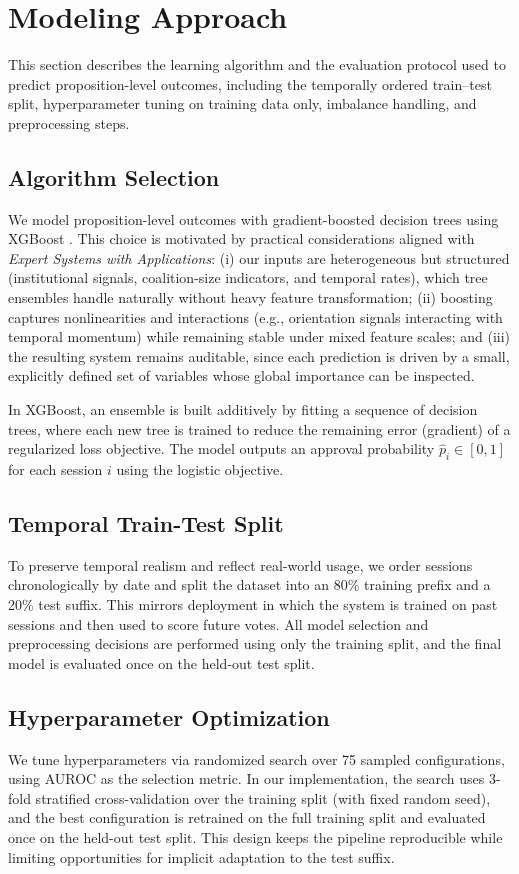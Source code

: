 \documentclass[review]{elsarticle}
\begin{document}
\section{Modeling Approach}
\label{modeling}

This section describes the learning algorithm and the evaluation protocol used to predict proposition-level outcomes, including the temporally ordered train--test split, hyperparameter tuning on training data only, imbalance handling, and preprocessing steps.

\subsection{Algorithm Selection}
We model proposition-level outcomes with gradient-boosted decision trees using XGBoost \citep{Chen2016XGBoost}. This choice is motivated by practical considerations aligned with \emph{Expert Systems with Applications}: (i) our inputs are heterogeneous but structured (institutional signals, coalition-size indicators, and temporal rates), which tree ensembles handle naturally without heavy feature transformation; (ii) boosting captures nonlinearities and interactions (e.g., orientation signals interacting with temporal momentum) while remaining stable under mixed feature scales; and (iii) the resulting system remains auditable, since each prediction is driven by a small, explicitly defined set of variables whose global importance can be inspected.
\par
In XGBoost, an ensemble is built additively by fitting a sequence of decision trees, where each new tree is trained to reduce the remaining error (gradient) of a regularized loss objective. The model outputs an approval probability $\hat{p}_i \in [0,1]$ for each session $i$ using the logistic objective.

\subsection{Temporal Train-Test Split}
To preserve temporal realism and reflect real-world usage, we order sessions chronologically by date and split the dataset into an 80\% training prefix and a 20\% test suffix. This mirrors deployment in which the system is trained on past sessions and then used to score future votes. All model selection and preprocessing decisions are performed using only the training split, and the final model is evaluated once on the held-out test split.

\subsection{Hyperparameter Optimization}
We tune hyperparameters via randomized search over 75 sampled configurations, using AUROC as the selection metric. In our implementation, the search uses 3-fold stratified cross-validation over the training split (with fixed random seed), and the best configuration is retrained on the full training split and evaluated once on the held-out test split. This design keeps the pipeline reproducible while limiting opportunities for implicit adaptation to the test suffix.
\end{document}
